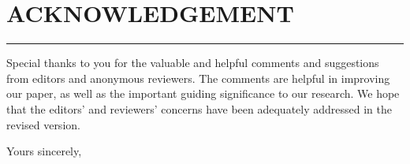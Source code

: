 \documentclass[journal,12pt, onecolumn]{IEEEtran}
\begin{document}
\newpage
\section*{\textbf{ACKNOWLEDGEMENT}}
\noindent\rule[0.25\baselineskip]{\textwidth}{1pt}

Special thanks to you for the valuable and helpful comments and suggestions from editors and anonymous reviewers. 
The comments are helpful in improving our paper, as well as the important guiding significance to our research. 
We hope that the editors' and reviewers' concerns have been adequately addressed in the revised version.

Yours sincerely,




%
%
%
\end{document}
